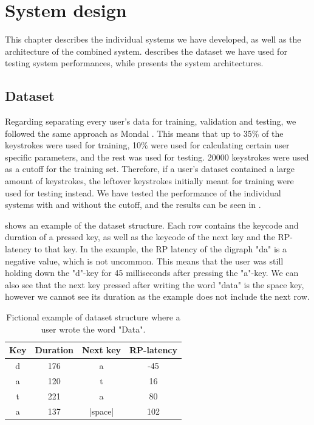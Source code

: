 \chapter{System design}
\label{chap:proposed}

This chapter describes the individual systems we have developed, as well as the architecture of the combined system.
 describes the dataset we have used for testing system performances, while  presents the system architectures.


\section{Dataset}
\label{sec:system-design-dataset}
Regarding separating every user's data for training, validation and testing, we followed the same approach as Mondal \cite{mondal}. 
This means that up to 35\% of the keystrokes were used for training, 10\% were used for calculating certain user specific parameters, and the rest was used for testing.
20000 keystrokes were used as a cutoff for the training set.
Therefore, if a user's dataset contained a large amount of keystrokes, the leftover keystrokes initially meant for training were used for testing instead.
We have tested the performance of the individual systems with and without the cutoff, and the results can be seen in .

 shows an example of the dataset structure.
Each row contains the keycode and duration of a pressed key, as well as the keycode of the next key and the RP-latency to that key.
In the example, the RP latency of the digraph "da" is a negative value, which is not uncommon.
This means that the user was still holding down the "d"-key for 45 milliseconds after pressing the "a"-key.
We can also see that the next key pressed after writing the word "data" is the space key, however we cannot see its duration as the example does not include the next row.

\begin{table}[h]
\centering
\begin{tabular}{cccc}
\hline
Key & Duration & Next key & RP-latency \\ \hline
d   & 176      & a        & -45\\
a   & 120      & t        & 16 \\
t   & 221      & a        & 80 \\ 
a   & 137      & |space|  & 102\\ \hline
\end{tabular}
\caption{Fictional example of dataset structure where a user wrote the word "Data".}
\label{tab:proposed_dataset_example}
\end{table}

